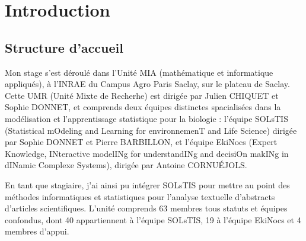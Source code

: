 \documentclass{book}
\begin{document}
\newpage
\mbox{} %
\thispagestyle{fancy}
\newpage


\newpage
\fancyhead[LE,RO]{\leftmark}
\chapter{\label{Premier Chapitre}Introduction}

\section{Structure d'accueil}
\noindent
Mon stage s'est déroulé dans l'Unité MIA (mathématique et informatique
appliqués), à l'INRAE du Campus Agro Paris Saclay, sur le plateau de Saclay.
Cette UMR (Unité Mixte de Recherhe) est dirigée par Julien CHIQUET et Sophie
DONNET, et comprends deux équipes distinctes spacialisées dans la modélisation
et l'apprentissage statistique pour la biologie : l'équipe SOLsTIS (Statistical
mOdeling and Learning for environnemenT and Life Science) dirigée par Sophie
DONNET et Pierre BARBILLON, et l'équipe EkiNocs (Expert Knowledge, INteractive
modelINg for understandINg and decisiOn makINg in dINamic Complexe Systems),
dirigée par Antoine CORNU\'{E}JOLS.

En tant que stagiaire, j'ai ainsi pu intégrer SOLsTIS pour mettre au point des
méthodes informatiques et statistiques pour l'analyse textuelle d'abstracts
d'articles scientifiques. L'unité comprends 63 membres tous statuts et équipes
confondus, dont 40 appartiennent à l'équipe SOLsTIS, 19 à l'équipe EkiNocs et 4
membres d'appui.

\lipsum[1-4]
\end{document}

